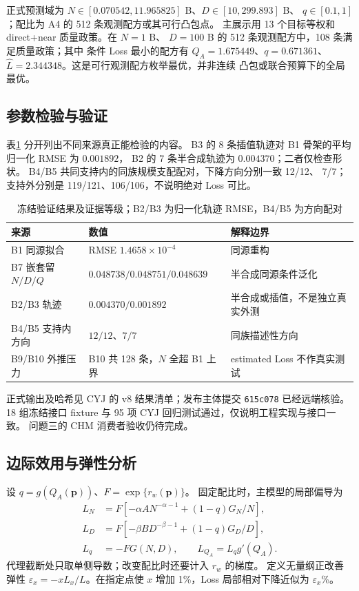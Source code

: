 正式预测域为 $N\in[0.070542,11.965825]$ B、$D\in[10,299.893]$ B、
$q\in[0.1,1]$；配比为 A4 的 512 条观测配方或其可行凸包点。
主展示用 13 个目标等权和 direct+near 质量政策。在 $N=1$ B、
$D=100$ B 的 512 条观测配方中，108 条满足质量政策；其中
条件 Loss 最小的配方有 $Q_A=1.675449$、$q=0.671361$、
$\widehat L=2.344348$。这是可行观测配方枚举最优，并非连续
凸包或联合预算下的全局最优。

\subsection{参数检验与验证}

表\ref{tab:cyj-q2-validation} 分开列出不同来源真正能检验的内容。
B3 的 8 条插值轨迹对 B1 骨架的平均归一化 RMSE 为 $0.001892$，
B2 的 7 条半合成轨迹为 $0.004370$；二者仅检查形状。
B4/B5 共同支持内的同族规模支配配对，下降方向分别一致 12/12、
7/7；支持外分别是 119/121、106/106，不说明绝对 Loss 可比。

\begin{table}[htbp]
\centering\small
\caption{冻结验证结果及证据等级；B2/B3 为归一化轨迹 RMSE，B4/B5 为方向配对}
\label{tab:cyj-q2-validation}
\begin{tabular}{p{}p{}p{}}
\hline
来源 & 数值 & 解释边界\\ \hline
B1 同源拟合 & RMSE $1.4658\times10^{-4}$ & 同源重构\\
B7 嵌套留 $N/D/Q$ & $0.048738/0.048751/0.048639$ & 半合成同源条件泛化\\
B2/B3 轨迹 & $0.004370/0.001892$ & 半合成或插值，不是独立真实外测\\
B4/B5 支持内方向 & $12/12$、$7/7$ & 同族描述性方向\\
B9/B10 外推压力 & B10 共 128 条，$N$ 全超 B1 上界 & estimated Loss 不作真实测试\\ \hline
\end{tabular}
\end{table}

正式输出及哈希见 CYJ 的 v8 结果清单；发布主体提交
\texttt{615c078} 已经远端核验。18 组冻结接口 fixture
与 95 项 CYJ 回归测试通过，仅说明工程实现与接口一致。
问题三的 CHM 消费者验收仍待完成。

\subsection{边际效用与弹性分析}

设 $q=g(Q_A(\boldsymbol p))$、$F=\exp\{r_w(\boldsymbol p)\}$。
固定配比时，主模型的局部偏导为
\begin{align}\label{eq:cyj-derivatives}
L_N&=F[-\alpha AN^{-\alpha-1}+(1-q)G_N/N],\\
L_D&=F[-\beta BD^{-\beta-1}+(1-q)G_D/D],\\
L_q&=-FG(N,D),\qquad L_{Q_A}=L_qg'(Q_A).
\end{align}
代理截断处只取单侧导数；改变配比时还要计入 $r_w$ 的梯度。
定义无量纲正改善弹性 $\varepsilon_x=-xL_x/L$。在指定点使
$x$ 增加 1\%，Loss 局部相对下降近似为 $\varepsilon_x$\%。

